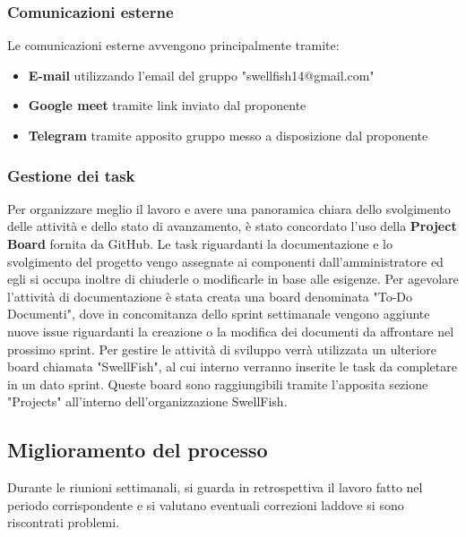 \documentclass[12pt]{article}
\begin{document}
\subsubsection{Comunicazioni esterne}
Le comunicazioni esterne avvengono principalmente tramite:
\begin{itemize}
    \item \textbf{E-mail} utilizzando l'email del gruppo "swellfish14@gmail.com"
    \item \textbf{Google meet} tramite link inviato dal proponente
    \item \textbf{Telegram} tramite apposito gruppo messo a disposizione dal proponente
\end{itemize}

\subsubsection{Gestione dei task}
Per organizzare meglio il lavoro e avere una panoramica chiara dello svolgimento delle attività e dello stato di avanzamento, è stato concordato l'uso della \textbf{Project Board} fornita da GitHub.
Le task riguardanti la documentazione e lo svolgimento del progetto vengo assegnate ai componenti dall'amministratore ed egli si occupa inoltre di chiuderle o modificarle in base alle esigenze.
Per agevolare l'attività di documentazione è stata creata una board denominata "To-Do Documenti", dove in concomitanza dello sprint settimanale vengono aggiunte nuove issue riguardanti la creazione o la modifica dei documenti da affrontare nel prossimo sprint.
Per gestire le attività di sviluppo verrà utilizzata un ulteriore board chiamata "SwellFish", al cui interno verranno inserite le task da completare in un dato sprint.
Queste board sono raggiungibili tramite l'apposita sezione "Projects" all'interno dell'organizzazione SwellFish.


\subsection{Miglioramento del processo} 
Durante le riunioni settimanali, si guarda in retrospettiva il lavoro fatto nel periodo corrispondente e si valutano eventuali correzioni laddove si sono riscontrati problemi.
\end{document}
